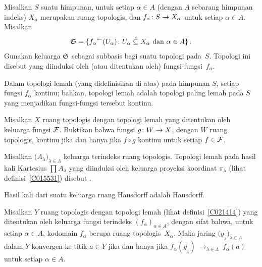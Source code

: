\begin{defn}\label{C021414} Misalkan $S$ suatu himpunan, untuk setiap $\alpha \in A$ (dengan
$A$ sebarang himpunan indeks) $X_\alpha$ merupakan ruang topologis, dan $f_\alpha
\colon S \rightarrow X_\alpha$ untuk setiap $\alpha \in A$. Misalkan
   \[ \mathfrak{S} = \{{f_\alpha}^\gets(U_\alpha) \colon U_\alpha\overset{\thickspace{}_\circ}{\subseteq}X_\alpha
                                             \text{ dan } \alpha \in A\}\,. \]
Gunakan keluarga $\mathfrak{S}$ sebagai subbasis bagi suatu topologi pada~$S$. Topologi ini disebut
 yang diinduksi oleh (atau ditentukan oleh) fungsi-fungsi~$f_\alpha$.
\end{defn}

\begin{prop}\label{C021421} Dalam topologi lemah (yang didefinisikan di atas) pada himpunan $S$, setiap fungsi $f_\alpha$ kontinu;
bahkan, topologi lemah adalah topologi paling lemah pada
$S$ yang menjadikan fungsi-fungsi tersebut kontinu.
\end{prop}

\begin{prop}\label{C021424} Misalkan $X$ ruang topologis dengan topologi lemah yang ditentukan
oleh keluarga fungsi $\mathcal{F}$. Buktikan bahwa fungsi $g\colon W \rightarrow X$, dengan $W$
ruang topologis, kontinu jika dan hanya jika $f \circ g$ kontinu untuk setiap $f
\in \mathcal{F}$.
\end{prop}

\begin{defn}\label{C021437} Misalkan $\bigl(A_\lambda\bigr)_{\lambda \in \Lambda}$ keluarga terindeks
ruang topologis. Topologi lemah pada hasil kali Kartesius $\prod
A_\lambda$ yang diinduksi oleh keluarga proyeksi koordinat $\pi_\lambda$ (lihat
definisi~\ref{C015531}) disebut
.
\end{defn}

\begin{prop} Hasil kali dari suatu keluarga ruang Hausdorff adalah Hausdorff.
\end{prop}

\begin{exam}\label{C031473} Misalkan $Y$ ruang topologis dengan topologi lemah (lihat
definisi~\ref{C021414}) yang ditentukan oleh keluarga fungsi terindeks $(f_\alpha)_{\alpha \in A}$,
dengan sifat bahwa, untuk setiap $\alpha \in A$, kodomain $f_\alpha$ berupa ruang topologis~$X_\alpha$.
Maka jaring $\bigl(y_{{}_\lambda}\bigr)_{\lambda \in \Lambda}$ dalam $Y$
konvergen ke titik $a \in Y$ jika dan hanya jika
\mbox{$f_\alpha(y_{{}_\lambda})~\to_{\lambda \in \Lambda}~f_\alpha(a)$} untuk setiap $\alpha
\in A$.
\end{exam}

